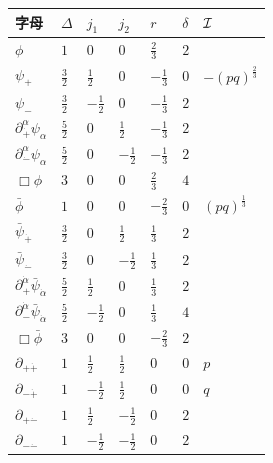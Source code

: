 \begin{center}
\begin{tabular}{C{4.6em} C{1.4em} C{1.4em} C{1.4em} C{1.4em} C{1.4em} C{2.2em}}
\toprule
字母 & $\Delta$ & $j_1$ & $j_2$ & $r$ & $\delta$ & $\mathcal{I}$ \\
\midrule
$\phi$ & $1$ & $0$ & $0$ & $\frac23$ & $2$ & \\
$\psi_+$ & $\frac32$ & $\frac12$ & $0$ & $-\frac13$ & $0$ & $-(pq)^{\frac23}$ \\
$\psi_-$ & $\frac32$ & $-\frac12$ & $0$ & $-\frac13$ & $2$ & \\
$\partial^\alpha_{\dot+}\psi_\alpha$ & $\frac52$ & $0$ & $\frac12$ & $-\frac13$ & $2$ & \\
$\partial^\alpha_{\dot-}\psi_\alpha$ & $\frac52$ & $0$ & $-\frac12$ & $-\frac13$ & $2$ & \\
$\Box\phi$ & $3$ & $0$ & $0$ & $\frac23$ & $4$ & \\
\midrule
$\bar\phi$ & $1$ & $0$ & $0$ & $-\frac23$ & $0$ & $(pq)^{\frac13}$ \\
$\bar\psi_{\dot+}$ & $\frac32$ & $0$ & $\frac12$ & $\frac13$ & $2$ & \\
$\bar\psi_{\dot-}$ & $\frac32$ & $0$ & $-\frac12$ & $\frac13$ & $2$ & \\
$\partial^{\dot\alpha}_{+}\bar\psi_{\dot\alpha}$ & $\frac52$ & $\frac12$ & $0$ & $\frac13$ & $2$ & \\
$\partial^{\dot\alpha}_{-}\bar\psi_{\dot\alpha}$ & $\frac52$ & $-\frac12$ & $0$ & $\frac13$ & $4$ & \\
$\Box\bar\phi$ & $3$ & $0$ & $0$ & $-\frac23$ & $2$ & \\
\midrule
$\partial_{+\dot+}$ & $1$ & $\frac12$ & $\frac12$ & $0$ & $0$ & $p$ \\
$\partial_{-\dot+}$ & $1$ & $-\frac12$ & $\frac12$ & $0$ & $0$ & $q$ \\
$\partial_{+\dot-}$ & $1$ & $\frac12$ & $-\frac12$ & $0$ & $2$ & \\
$\partial_{-\dot-}$ & $1$ & $-\frac12$ & $-\frac12$ & $0$ & $2$ & \\
\bottomrule
\end{tabular}
\end{center}

